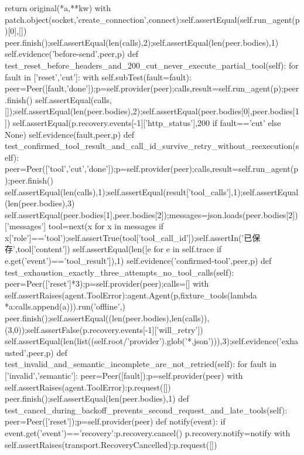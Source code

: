 {            return original(*a,**kw)
        with patch.object(socket,'create_connection',connect):self.assertEqual(self.run_agent(p)[0],[])
        peer.finish();self.assertEqual(len(calls),2);self.assertEqual(len(peer.bodies),1)
        self.evidence('before-send',peer,p)
    def test_reset_before_headers_and_200_cut_never_execute_partial_tool(self):
        for fault in ['reset','cut']:
            with self.subTest(fault=fault):
                peer=Peer([fault,'done']);p=self.provider(peer);calls,result=self.run_agent(p);peer.finish()
                self.assertEqual(calls,[]);self.assertEqual(len(peer.bodies),2);self.assertEqual(peer.bodies[0],peer.bodies[1])
                self.assertEqual(p.recovery.events[-1]['http_status'],200 if fault=='cut' else None)
                self.evidence(fault,peer,p)
    def test_confirmed_tool_result_and_call_id_survive_retry_without_reexecution(self):
        peer=Peer(['tool','cut','done']);p=self.provider(peer);calls,result=self.run_agent(p);peer.finish()
        self.assertEqual(len(calls),1);self.assertEqual(result['tool_calls'],1);self.assertEqual(len(peer.bodies),3)
        self.assertEqual(peer.bodies[1],peer.bodies[2]);messages=json.loads(peer.bodies[2])['messages']
        tool=next(x for x in messages if x['role']=='tool');self.assertTrue(tool['tool_call_id']);self.assertIn('已保存',tool['content'])
        self.assertEqual(len([e for e in self.trace if e.get('event')=='tool_result']),1)
        self.evidence('confirmed-tool',peer,p)
    def test_exhaustion_exactly_three_attempts_no_tool_calls(self):
        peer=Peer(['reset']*3);p=self.provider(peer);calls=[]
        with self.assertRaises(agent.ToolError):agent.Agent(p,fixture_tools(lambda *a:calls.append(a))).run('offline',{})
        peer.finish();self.assertEqual((len(peer.bodies),len(calls)),(3,0));self.assertFalse(p.recovery.events[-1]['will_retry'])
        self.assertEqual(len(list((self.root/'provider').glob('*.json'))),3);self.evidence('exhausted',peer,p)
    def test_invalid_and_semantic_incomplete_are_not_retried(self):
        for fault in ['invalid','semantic']:
            peer=Peer([fault]);p=self.provider(peer)
            with self.assertRaises(agent.ToolError):p.request([])
            peer.finish();self.assertEqual(len(peer.bodies),1)
    def test_cancel_during_backoff_prevents_second_request_and_late_tools(self):
        peer=Peer(['reset']);p=self.provider(peer)
        def notify(event):
            if event.get('event')=='recovery':p.recovery.cancel()
        p.recovery.notify=notify
        with self.assertRaises(transport.RecoveryCancelled):p.request([])
}

